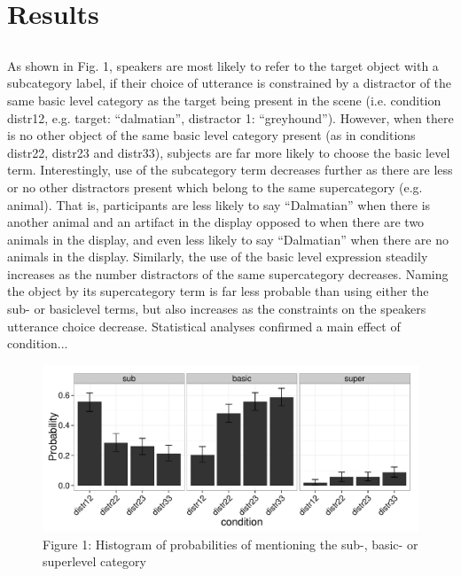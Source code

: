 \documentclass[10pt,letterpaper]{article}
\begin{document}
\section{\bf Results}

\subsection{}
As shown in Fig. 1, speakers are most  likely to refer to the target object with a subcategory label, if their choice of utterance is constrained by a distractor of the same basic level category as the target being present in the scene (i.e. condition distr12, e.g. target: ``dalmatian'', distractor 1: ``greyhound''). However, when there is no other object of the same basic level category present (as in conditions distr22, distr23 and distr33), subjects are far more likely to choose the basic level term. Interestingly, use of the subcategory term decreases further as there are less or no other distractors present which belong to the same supercategory (e.g. animal). That is, participants are less likely to say ``Dalmatian'' when there is another animal and an artifact in the display opposed to when there are two animals in the display, and even less likely to say ``Dalmatian'' when there are no animals in the display. Similarly, the use of the basic level expression steadily increases as the number distractors of the same supercategory decreases. Naming the object by its supercategory term is far less probable than using either the sub- or basiclevel terms, but also increases as the constraints on the speakers utterance choice decrease. Statistical analyses confirmed a main effect of condition...

\begin{figure}[ht!]
\centering
\includegraphics[width=.5\textwidth]{graphs/proportion_mentioned_features}
\caption{Figure 1: Histogram of probabilities of mentioning the sub-, basic- or superlevel category \label{overflow}}
\end{figure}
\end{document}
